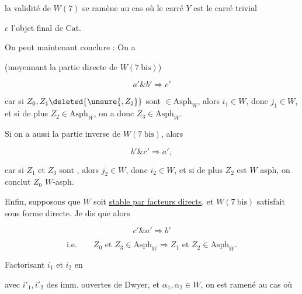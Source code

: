 
la validité de $W(7)$ se ramène au cas où le carré $Y$ est le carré trivial


$e$ l'objet final de $\mathrm{Cat}$.

On peut maintenant conclure :  On a


(moyennant la partie directe de $W(7\ \mathrm{bis})$)

\[
a'\mathbin{\&}b'\Longrightarrow c'
\]

car si $Z_0,Z_1\deleted{\unsure{,Z_2}}$ sont $\in\mathrm{Asph}_W$, alors $i_1\in W$, donc $j_1\in W$, et si de plus $Z_2\in\mathrm{Asph}_W$, on a donc $Z_3\in\mathrm{Asph}_W$.

Si on a aussi la partie inverse  de $W(7\ \mathrm{bis})$, alors

\[
b'\mathbin{\&}c'\Longrightarrow a',
\]

car si $Z_1$ et $Z_3$ sont , alors $j_2\in W$, donc $i_2\in W$, et si de plus $Z_2$ est $W$ asph, on conclut $Z_0$ $W$-asph.

Enfin, supposons que $W$ soit \uline{stable par facteurs directs}, et $W(7\ \mathrm{bis})$ satisfait sous forme directe. Je dis que alors

\[
c'\mathbin{\&}a'\Longrightarrow b'
\]

\[
\text{i.e.}\qquad Z_0\text{ et } Z_3\in\mathrm{Asph}_W\Longrightarrow Z_1\text{ et }Z_2\in\mathrm{Asph}_W.
\]

Factorisant $i_1$ et $i_2$ en


avec $i'_1,i'_2$ des imm. ouvertes de Dwyer, et $\alpha_1,\alpha_2\in W$, on est ramené au cas où
